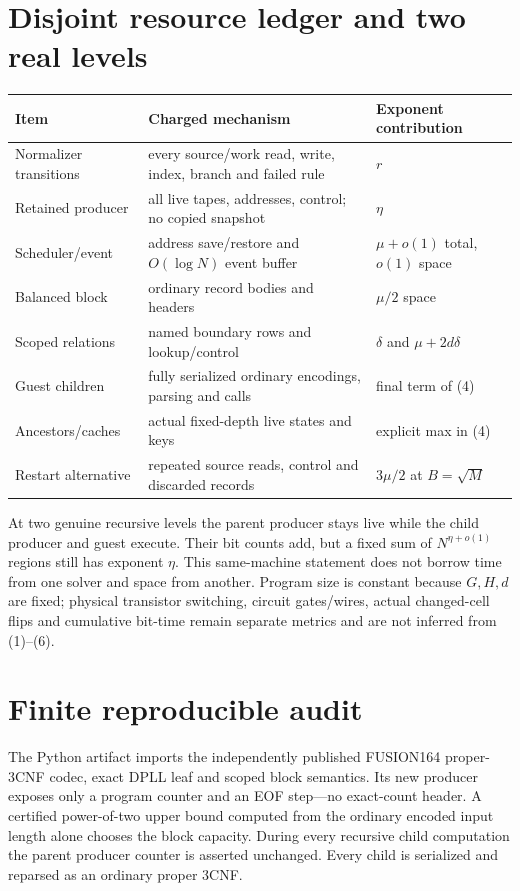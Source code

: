 \documentclass[11pt]{article}
\begin{document}
\section{Disjoint resource ledger and two real levels}
\begin{center}
\begin{tabularx}{.98\linewidth}{p{.22\linewidth}X p{.18\linewidth}}
\toprule
Item & Charged mechanism & Exponent contribution\\
\midrule
Normalizer transitions & every source/work read, write, index, branch and failed rule & $r$\\
Retained producer & all live tapes, addresses, control; no copied snapshot & $\eta$\\
Scheduler/event & address save/restore and $O(\log N)$ event buffer & $\mu+o(1)$ total, $o(1)$ space\\
Balanced block & ordinary record bodies and headers & $\mu/2$ space\\
Scoped relations & named boundary rows and lookup/control & $\delta$ and $\mu+2d\delta$\\
Guest children & fully serialized ordinary encodings, parsing and calls & final term of (4)\\
Ancestors/caches & actual fixed-depth live states and keys & explicit max in (4)\\
Restart alternative & repeated source reads, control and discarded records & $3\mu/2$ at $B=\sqrt M$\\
\bottomrule
\end{tabularx}
\end{center}
At two genuine recursive levels the parent producer stays live while the child
producer and guest execute.  Their bit counts add, but a fixed sum of
$N^{\eta+o(1)}$ regions still has exponent $\eta$.  This same-machine statement
does not borrow time from one solver and space from another.  Program size is
constant because $G,H,d$ are fixed; physical transistor switching, circuit
gates/wires, actual changed-cell flips and cumulative bit-time remain separate
metrics and are not inferred from (1)--(6).

\section{Finite reproducible audit}
The Python artifact imports the independently published FUSION164 proper-3CNF
codec, exact DPLL leaf and scoped block semantics.  Its new producer exposes
only a program counter and an EOF step---no exact-count header.  A certified
power-of-two upper bound computed from the ordinary encoded input length alone
chooses the block capacity.  During every recursive
child computation the parent producer counter is asserted unchanged.  Every
child is serialized and reparsed as an ordinary proper 3CNF.
\end{document}
